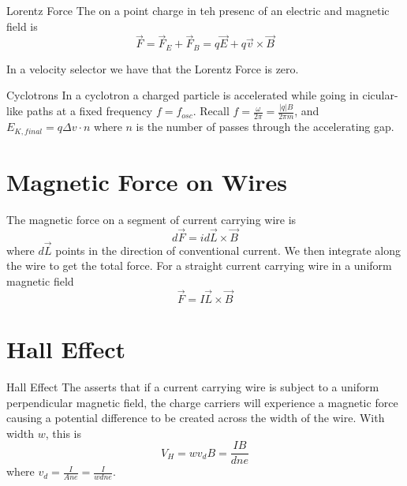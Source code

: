 \documentclass[12pt]{report}
\begin{document}
\begin{defn}{Lorentz Force}{}
        The  on a point charge in teh presenc of an electric and magnetic field is \begin{equation}
                \vec{F} = \vec{F}_E +\vec{F}_B = q\vec{E}  + q\vec{v}\times \vec{B}
        \end{equation}
\end{defn}


\begin{rmk}{}{}
        In a velocity selector we have that the Lorentz Force is zero.
\end{rmk}


\begin{rmk}{Cyclotrons}{}
        In a cyclotron a charged particle is accelerated while going in cicular-like paths at a fixed frequency $f = f_{osc}$. Recall $f = \frac{\omega}{2\pi} = \frac{|q|B}{2\pi m}$, and $E_{K,final} = q\Delta v\cdot n$ where $n$ is the number of passes through the accelerating gap.
\end{rmk}


\section{Magnetic Force on Wires}

\begin{defn}{}{}
        The magnetic force on a segment of current carrying wire is \begin{equation}
                d\vec{F} = id\vec{L}\times \vec{B}
        \end{equation}
        where $d\vec{L}$ points in the direction of conventional current. We then integrate along the wire to get the total force. For a straight current carrying wire in a uniform magnetic field \begin{equation}
                \vec{F} = I\vec{L}\times \vec{B}
        \end{equation}
\end{defn}


\section{Hall Effect}


\begin{claim}{Hall Effect}{}
        The  asserts that if a current carrying wire is subject to a uniform perpendicular magnetic field, the charge carriers will experience a magnetic force causing a potential difference to be created across the width of the wire. With width $w$, this  is \begin{equation}
                V_H = wv_dB = \frac{IB}{dne}
        \end{equation}
        where $v_d = \frac{I}{Ane} = \frac{I}{wdne}$.
\end{claim}
\end{document}
